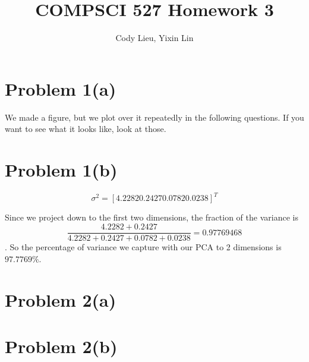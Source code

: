 \documentclass{article}
\author{Cody Lieu, Yixin Lin}
\title{COMPSCI 527 Homework 3}
\begin{document}
\maketitle

\section*{Problem 1(a)}


We made a figure, but we plot over it repeatedly in the following questions. If you want to see what it looks like, look at those.

\section*{Problem 1(b)}

$$\sigma^2  = [4.2282 0.2427 0.0782 0.0238]^T $$

Since we project down to the first two dimensions, the fraction of the variance is $$\frac{4.2282 + 0.2427}{4.2282 + 0.2427 + 0.0782 + 0.0238} = 0.97769468$$. So the percentage of variance we capture with our PCA to 2 dimensions is $97.7769\%$.

\section*{Problem 2(a)}


\section*{Problem 2(b)}

\end{document}
